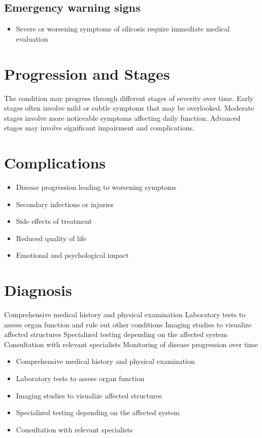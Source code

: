 \subsection{Emergency warning signs}
\begin{itemize}[noitemsep]
  \item Severe or worsening symptoms of silicosis require immediate medical evaluation
\end{itemize}
\section{Progression and Stages}
The condition may progress through different stages of severity over time. Early stages often involve mild or subtle symptoms that may be overlooked. Moderate stages involve more noticeable symptoms affecting daily function. Advanced stages may involve significant impairment and complications.
\section{Complications}
\begin{itemize}[noitemsep]
  \item Disease progression leading to worsening symptoms
  \item Secondary infections or injuries
  \item Side effects of treatment
  \item Reduced quality of life
  \item Emotional and psychological impact
\end{itemize}
\section{Diagnosis}
Comprehensive medical history and physical examination Laboratory tests to assess organ function and rule out other conditions Imaging studies to visualize affected structures Specialized testing depending on the affected system Consultation with relevant specialists Monitoring of disease progression over time

\begin{itemize}[noitemsep]
  \item Comprehensive medical history and physical examination
  \item Laboratory tests to assess organ function
  \item Imaging studies to visualize affected structures
  \item Specialized testing depending on the affected system
  \item Consultation with relevant specialists
\end{itemize}
